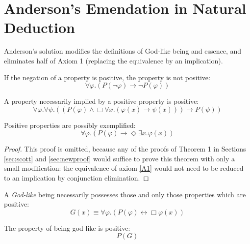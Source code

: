\documentclass[smallextended]{svjour3}
\newcommand{\imp}{\rightarrow}
\newcommand{\biimp}{\leftrightarrow}
\newcommand{\all}{\forall}
\newcommand{\ex}{\exists}
\newcommand{\nec}{\Box} %
\newcommand{\pos}{\Diamond} %
\begin{document}
\section{Anderson's Emendation in Natural Deduction}
\label{sec:anderson}


Anderson's solution \citep{and90} modifies the definitions of God-like being and essence, and eliminates half of Axiom 1 (replacing the equivalence by an implication).  





\setcounter{axiom}{0}
\setcounter{lemma}{0}
\setcounter{theorem}{0}
\setcounter{corollary}{0}
\setcounter{definition}{0}

\begin{axiom}[Emended]
\label{A:A1}
If the negation of a property is positive, the property is not positive:
$$
\all \varphi. (P(\neg \varphi) \imp \neg P(\varphi))
$$
\end{axiom}

\begin{axiom}[As in Scott's]
\label{A:A2}
A property necessarily implied by a positive property is positive:
$$
\all \varphi. \all \psi.((P(\varphi) \wedge \nec \all x.(\varphi(x) \imp \psi(x))) \imp P(\psi))
$$
\end{axiom}


\begin{theorem}
\label{A:T1}
Positive properties are possibly exemplified:
$$
\all \varphi. (P(\varphi) \imp \pos \ex x.\varphi(x))
$$
\end{theorem}
\begin{proof}
This proof is omitted, because any of the proofs of Theorem 1 in Sections \ref{sec:scott} and \ref{sec:newproof} would suffice to prove this theorem with only a small modification: the equivalence of axiom \ref{A1} would not need to be reduced to an implication by conjunction elimination. 
\end{proof}



\begin{definition}[Emended]
\label{A:D1}
A \emph{God-like} being necessarily possesses those and only those properties which are positive:
$$
G(x) \equiv \forall \varphi. (P(\varphi) \biimp \nec \varphi(x))
$$
\end{definition}

\begin{axiom}[As in Scott's]
\label{A:A3}
The property of being god-like is positive:
$$
P(G)
$$
\end{axiom}
\end{document}
